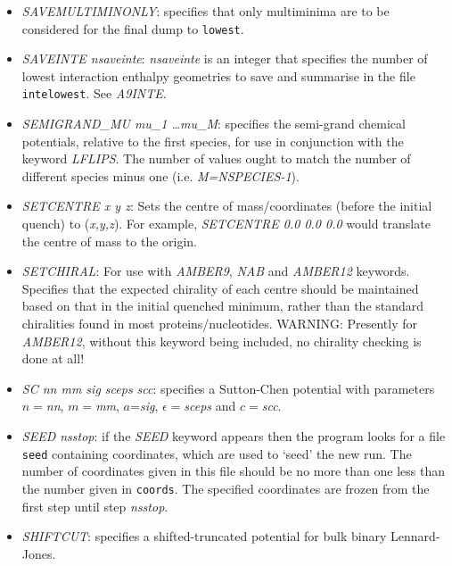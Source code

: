 \documentclass[12pt,a4paper,dvips]{article}
\begin{document}
\begin{itemize}
\item {\it SAVEMULTIMINONLY\/}: specifies that only multiminima are to be considered for the final dump to {\tt lowest}.

\item {\it SAVEINTE nsaveinte\/}: {\it nsaveinte\/} is an integer that specifies the number of lowest
interaction enthalpy geometries to save and summarise in the file {\tt intelowest}. See {\it A9INTE\/}. 

\item {\it SEMIGRAND\_MU mu\_1 \dots mu\_M\/}: specifies the semi-grand chemical potentials, relative to the first species, for use in conjunction with the keyword {\it LFLIPS\/}. The number of values ought to match the number of different species minus one (i.e. {\it M=NSPECIES-1}).

\item {\it SETCENTRE x y z\/}: Sets the centre of mass/coordinates (before the initial quench) to ({\it x,y,z\/}). For example, {\it SETCENTRE 0.0 0.0 0.0\/}
would translate the centre of mass to the origin.

\item {\it SETCHIRAL}: For use with {\it AMBER9}, {\it NAB} and {\it AMBER12} keywords. Specifies that the expected chirality of each centre should be
maintained based on that in the initial quenched minimum, rather than the standard chiralities found in most proteins/nucleotides. 
WARNING: Presently for {\it AMBER12}, without this keyword being included, no chirality checking is done at all!

\item {\it SC nn mm sig sceps scc\/}: specifies a Sutton-Chen potential\cite{suttonc90} with
parameters $n=${\it nn\/}, $m=${\it mm\/}, $a$={\it sig\/}, $\epsilon=${\it sceps\/} and 
$c=${\it scc\/}.

\item {\it SEED nsstop\/}: if the {\it SEED\/} keyword appears then the program
looks for a file {\tt seed} containing coordinates, which are used to `seed' the new run.
The number of coordinates given in this file should be no more than one less than the number
given in {\tt coords}. The specified coordinates are frozen from the first step until 
step {\it nsstop\/}.

\item {\it SHIFTCUT\/}: specifies a shifted-truncated potential for bulk binary Lennard-Jones.



\end{itemize}
\end{document}
